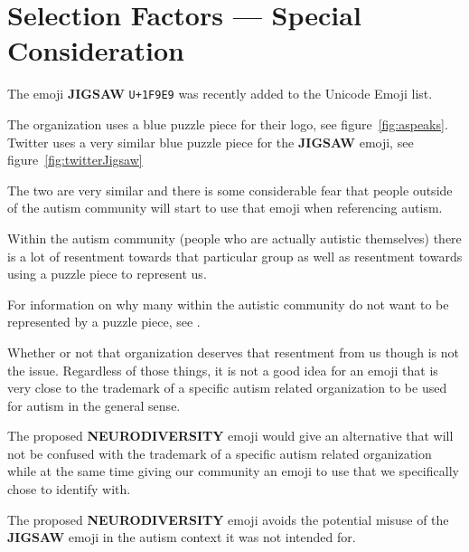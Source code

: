 \section{Selection Factors --- Special Consideration}

The emoji \textbf{JIGSAW} \texttt{U+1F9E9} was recently added to the Unicode Emoji list.

The organization  uses a blue puzzle piece for their logo, see figure~\ref{fig:aspeaks}. Twitter uses a very similar blue puzzle piece for the \textbf{JIGSAW} emoji, see figure~\ref{fig:twitterJigsaw}

The two are very similar and there is some considerable fear that people outside of the autism community will start to use that emoji when referencing autism.

Within the autism community (people who are actually autistic themselves) there is a lot of resentment towards that particular group as well as resentment towards using a puzzle piece to represent us.

For information on why many within the autistic community do not want to be represented by a puzzle piece, see .

Whether or not that organization deserves that resentment from us though is not the issue. Regardless of those things, it is not a good idea for an emoji that is very close to the trademark of a specific autism related organization to be used for autism in the general sense.

The proposed \textbf{NEURODIVERSITY} emoji would give an alternative that will not be confused with the trademark of a specific autism related organization while at the same time giving our community an emoji to use that we specifically chose to identify with.

The proposed \textbf{NEURODIVERSITY} emoji avoids the potential misuse of the \textbf{JIGSAW} emoji in the autism context it was not intended for.

